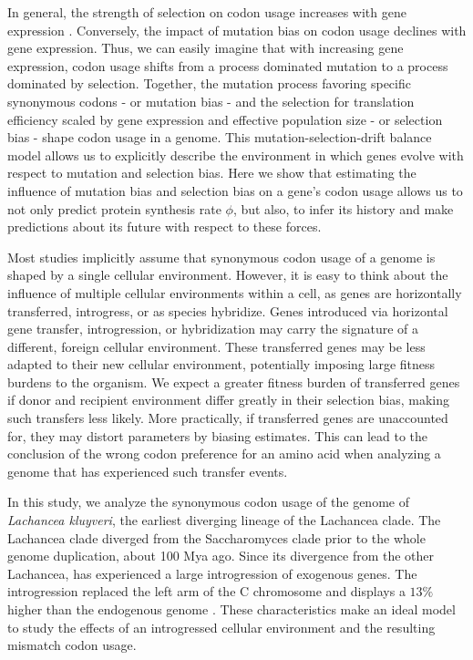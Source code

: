 In general, the strength of selection on codon usage increases with gene expression \citep{ikemura1985, gouy1982}.
Conversely, the impact of mutation bias on codon usage declines with gene expression.
Thus, we can easily imagine that with increasing gene expression, codon usage shifts from a process dominated mutation to a process dominated by selection.
Together, the mutation process favoring specific synonymous codons - or mutation bias -  and the selection for translation efficiency scaled by gene expression and effective population size - or selection bias -  shape codon usage in a genome.
This mutation-selection-drift balance model allows us to explicitly describe the environment in which genes evolve with respect to mutation and selection bias.
Here we show that estimating the influence of mutation bias and selection bias on a gene's codon usage allows us to not only predict protein synthesis rate $\phi$, but also, to infer its history and make predictions about its future with respect to these forces.

Most studies implicitly assume that synonymous codon usage of a genome is shaped by a single cellular environment. 
However, it is easy to think about the influence of multiple cellular environments within a cell, as genes are horizontally transferred, introgress, or as species hybridize.
Genes introduced via horizontal gene transfer, introgression, or hybridization may carry the signature of a different, foreign cellular environment.
These transferred genes may be less adapted to their new cellular environment, potentially imposing large fitness burdens to the organism.
We expect a greater fitness burden of transferred genes if donor and recipient environment differ greatly in their selection bias, making such transfers less likely.
More practically, if transferred genes are unaccounted for, they may distort parameters by biasing estimates.
This can lead to the conclusion of the wrong codon preference for an amino acid when analyzing a genome that has experienced such transfer events.  

In this study, we analyze the synonymous codon usage of the genome of \textit{Lachancea kluyveri}, the earliest diverging lineage of the Lachancea clade.
The Lachancea clade diverged from the Saccharomyces clade prior to the whole genome duplication, about 100 Mya ago.
Since its divergence from the other Lachancea, \kluyveri  has experienced a large introgression of exogenous genes.
The introgression replaced the left arm of the C chromosome and displays a $13 \%$ higher \GC than the endogenous \kluyveri genome \citep{payen2009, friedrich2015}.
These characteristics make \kluyveri an ideal model to study the effects of an introgressed cellular environment and the resulting mismatch codon usage.

